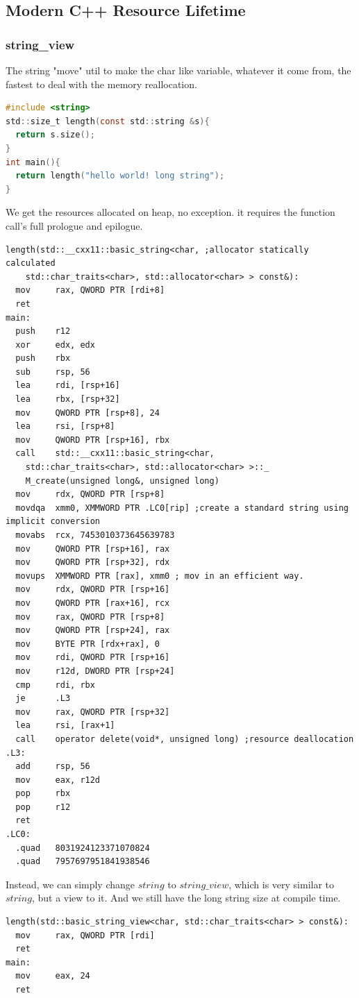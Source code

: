 \documentclass[a4paper]{exam}
\theoremstyle{definition}
\begin{document}
\subsection{Modern C++ Resource Lifetime}
\subsubsection{string\_view}
The string "move" util to make the char like variable, whatever it come from, the fastest to deal with the memory reallocation.

\begin{lstlisting}[language=C]
#include <string>
std::size_t length(const std::string &s){
  return s.size();
}
int main(){
  return length("hello world! long string");
}
\end{lstlisting}

We get the resources allocated on heap, no exception. it requires the function call's full prologue and epilogue.
\begin{lstlisting}[language={[Motorola68k]Assembler}]
  length(std::__cxx11::basic_string<char, ;allocator statically calculated
    std::char_traits<char>, std::allocator<char> > const&):
  mov     rax, QWORD PTR [rdi+8]
  ret
main:
  push    r12
  xor     edx, edx
  push    rbx
  sub     rsp, 56
  lea     rdi, [rsp+16]
  lea     rbx, [rsp+32]
  mov     QWORD PTR [rsp+8], 24
  lea     rsi, [rsp+8]
  mov     QWORD PTR [rsp+16], rbx
  call    std::__cxx11::basic_string<char, 
    std::char_traits<char>, std::allocator<char> >::_
    M_create(unsigned long&, unsigned long)
  mov     rdx, QWORD PTR [rsp+8]
  movdqa  xmm0, XMMWORD PTR .LC0[rip] ;create a standard string using implicit conversion
  movabs  rcx, 7453010373645639783
  mov     QWORD PTR [rsp+16], rax
  mov     QWORD PTR [rsp+32], rdx
  movups  XMMWORD PTR [rax], xmm0 ; mov in an efficient way.
  mov     rdx, QWORD PTR [rsp+16]
  mov     QWORD PTR [rax+16], rcx
  mov     rax, QWORD PTR [rsp+8]
  mov     QWORD PTR [rsp+24], rax
  mov     BYTE PTR [rdx+rax], 0
  mov     rdi, QWORD PTR [rsp+16]
  mov     r12d, DWORD PTR [rsp+24]
  cmp     rdi, rbx
  je      .L3
  mov     rax, QWORD PTR [rsp+32]
  lea     rsi, [rax+1]
  call    operator delete(void*, unsigned long) ;resource deallocation
.L3:
  add     rsp, 56
  mov     eax, r12d
  pop     rbx
  pop     r12
  ret
.LC0:
  .quad   8031924123371070824
  .quad   7957697951841938546
\end{lstlisting}
Instead, we can simply change $string$ to $string\_view$, which is very similar to $string$, but a view to it. And we still have the long string size at compile time.
\begin{lstlisting}[language={[Motorola68k]Assembler}]
length(std::basic_string_view<char, std::char_traits<char> > const&):
  mov     rax, QWORD PTR [rdi]
  ret
main:
  mov     eax, 24
  ret
\end{lstlisting}
\end{document}
